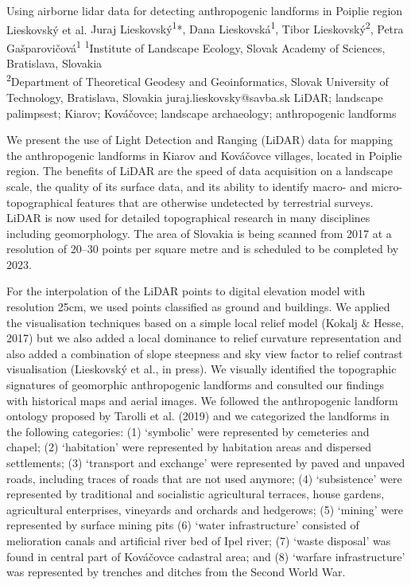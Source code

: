 
\abstract
{Using airborne lidar data for detecting anthropogenic landforms in Poiplie region} %
{Lieskovský et al.} %
{Juraj Lieskovský\textsuperscript{1}*, Dana Lieskovská\textsuperscript{1}, Tibor Lieskovský\textsuperscript{2}, Petra Gašparovičová\textsuperscript{1}} %
{\TLtag} %
{\textsuperscript{1}Institute of Landscape Ecology, Slovak Academy of Sciences, Bratislava, Slovakia\\
\textsuperscript{2}Department of Theoretical Geodesy and Geoinformatics, Slovak University of Technology, Bratislava, Slovakia
} %
{juraj.lieskovsky@savba.sk}  %
{LiDAR; landscape palimpsest; Kiarov; Kováčovce; landscape archaeology; anthropogenic landforms}%
{We present the use of Light Detection and Ranging  (LiDAR) data for mapping the anthropogenic landforms in Kiarov and Kováčovce villages, located in Poiplie region. The benefits of LiDAR are the speed of data acquisition on a landscape scale, the quality of its surface data, and its ability to identify macro- and micro-topographical features that are otherwise undetected by terrestrial surveys. LiDAR is now used for detailed topographical research in many disciplines including geomorphology. The area of Slovakia is being scanned from 2017 at a resolution of 20–30 points per square metre and is scheduled to be completed by 2023. 
	
For the interpolation of the LiDAR points to digital elevation model with resolution 25cm, we used points classified as ground and buildings. We applied the visualisation techniques based on a simple local relief model (Kokalj \& Hesse, 2017) but we also added a local dominance to relief curvature representation and also added a combination of slope steepness and sky view factor to relief contrast visualisation (Lieskovský et al., in press). We visually identified the topographic signatures of geomorphic anthropogenic landforms and consulted our findings with historical maps and aerial images. We followed the anthropogenic landform ontology proposed by Tarolli et al. (2019) and we categorized the landforms in the following categories: (1) \enquote*{symbolic} were represented by cemeteries and chapel; (2) \enquote*{habitation} were represented by habitation areas and dispersed settlements; (3) \enquote*{transport and exchange} were represented by paved and unpaved roads, including traces of roads that are not used anymore; (4) \enquote*{subsistence} were represented by traditional and socialistic agricultural terraces, house gardens, agricultural enterprises, vineyards and orchards and  hedgerows; (5) \enquote*{mining} were represented by surface mining pits (6) \enquote*{water infrastructure} consisted of melioration canals and artificial river bed of Ipel river; (7) \enquote*{waste disposal} was found in central part of Kováčovce cadastral area; and (8) \enquote*{warfare infrastructure} was represented by trenches and ditches from the Second World War.
}%
